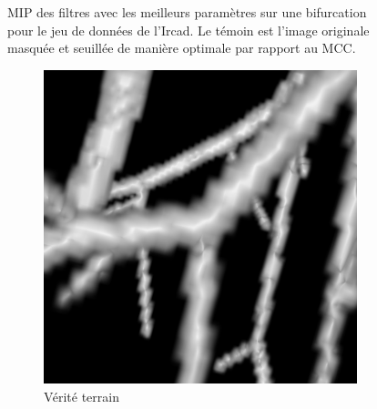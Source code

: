 \begin{figure}[!ht]
      \caption{MIP des filtres avec les meilleurs paramètres sur une bifurcation pour le jeu de données de l'Ircad. Le témoin est l'image originale masquée et seuillée de manière optimale par rapport au MCC.
      }
      \label{fig:bifurcation_Ircad}
  \end{figure}
  
  \begin{figure}[!ht]
    \captionsetup[subfigure]{justification=centering}
    \centering
    \begin{subfigure}[t]{0.30\textwidth}
      \includegraphics[clip = true, trim  =  170 230 150 240, width=\textwidth]{Images/Vascu_2_k_GT.png}
      \caption{Vérité terrain}
    \end{subfigure}
    \begin{subfigure}[t]{0.30\textwidth}

\end{subfigure}
\end{figure}
